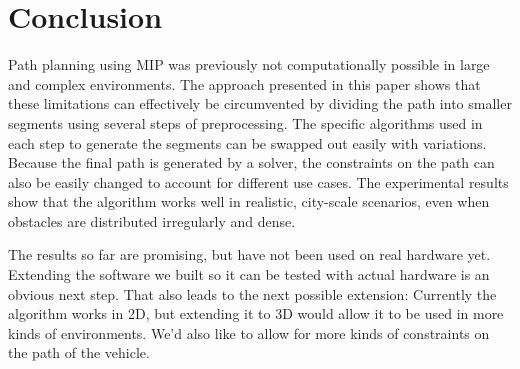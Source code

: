 \section{Conclusion}
Path planning using MIP was previously not computationally possible in large and complex environments. The approach presented in this paper shows that these limitations can effectively be circumvented by dividing the path into smaller segments using several steps of preprocessing. The specific algorithms used in each step to generate the segments can be swapped out easily with variations. Because the final path is generated by a solver, the constraints on the path can also be easily changed to account for different use cases. The experimental results show that the algorithm works well in realistic, city-scale scenarios, even when obstacles are distributed irregularly and dense.

The results so far are promising, but have not been used on real hardware yet. Extending the software we built so it can be tested with actual hardware is an obvious next step. That also leads to the next possible extension: Currently the algorithm works in 2D, but extending it to 3D would allow it to be used in more kinds of environments. We'd also like to allow for more kinds of constraints on the path of the vehicle.